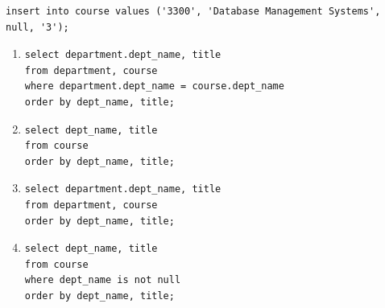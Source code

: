 \documentclass{article}
\begin{document}
\begin{enumerate}
\begin{verbatim}
insert into course values ('3300', 'Database Management Systems', null, '3');
\end{verbatim}

  \begin{enumerate}

    \item[(A)] 
\begin{verbatim}
select department.dept_name, title
from department, course
where department.dept_name = course.dept_name
order by dept_name, title;
\end{verbatim}

    \item[(B)] 
\begin{verbatim}
select dept_name, title
from course 
order by dept_name, title;
\end{verbatim}

    \item[(C)] 
\begin{verbatim}
select department.dept_name, title
from department, course
order by dept_name, title;
\end{verbatim}

    \item[(D)] 
\begin{verbatim}
select dept_name, title
from course
where dept_name is not null
order by dept_name, title;

\end{verbatim}

  \end{enumerate}

\end{enumerate}
\end{document}
